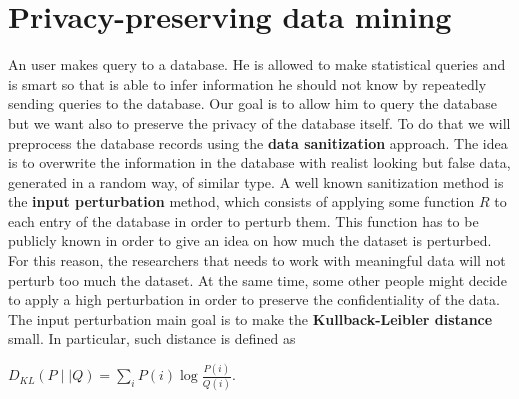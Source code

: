 \section{Privacy-preserving data mining}
An user makes query to a database. He is allowed to make statistical queries and is smart so that is able to infer information he should not know by repeatedly sending queries to the database. Our goal is to allow him to query the database but we want also to preserve the privacy of the database itself. To do that we will preprocess the database records using the \textbf{data sanitization} approach. The idea is to overwrite the information in the database with realist looking but false data, generated in a random way, of similar type. A well known sanitization method is the \textbf{input perturbation} method, which consists of applying some function $R$ to each entry of the database in order to perturb them. This function has to be publicly known in order to give an idea on how much the dataset is perturbed. For this reason, the researchers that needs to work with meaningful data will not perturb too much the dataset. At the same time, some other people might decide to apply a high perturbation in order to preserve the confidentiality of the data. The input perturbation main goal is to make the \textbf{Kullback-Leibler distance} small. In particular, such distance is defined as 
\begin{center}
$D_{KL}(P \mid \mid Q) = \sum_{i} P(i) \log \frac{P(i)}{Q(i)}$.
\end{center}
